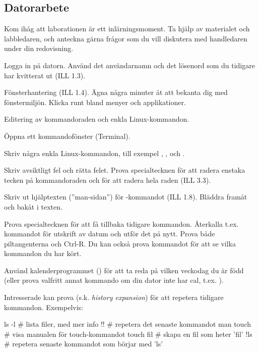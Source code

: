 \subsection{Datorarbete}
Kom ihåg att laborationen är ett inlärningsmoment. Ta hjälp av materialet och labbledaren, och anteckna gärna frågor som du vill diskutera med handledaren under din redovisning.
\begin{Datorarbete}
\item Logga in på datorn. Använd det användarnamn och det lösenord som du tidigare har kvitterat ut (ILL 1.3).
\item Fönsterhantering (ILL 1.4). Ägna några minuter åt att bekanta dig med fönstermiljön. Klicka runt bland menyer och applikationer.
\item Editering av kommandoraden och enkla Linux-kommandon.

\begin{Deluppgifter}
\item Öppna ett kommandofönster (Terminal).
\item Skriv några enkla Linux-kommandon, till exempel , ,  och .
\item Skriv avsiktligt fel och rätta felet. Prova specialtecknen för att radera enstaka tecken på kommandoraden och för att radera hela raden (ILL 3.3).
\item Skriv ut hjälptexten (''man-sidan'') för -kommandot (ILL 1.8). Bläddra framåt och bakåt i texten.
\item Prova specialtecknen för att få tillbaka tidigare kommandon. Återkalla t.ex. kommandot för utskrift av datum och utför det på nytt. Prova både piltangenterna och Ctrl-R. Du kan också prova kommandot  för att se vilka kommandon du har kört.
\item Använd kalenderprogrammet () för att ta reda på vilken veckodag du är född (eller prova valfritt annat kommando om din dator inte har cal, t.ex. ).
\item Intresserade kan prova \code{!} (s.k. \emph{history expansion}) för att repetera tidigare kommandon. Exempelvis:
\begin{Code}[language=bash,keywords=]
ls -l      # lista filer, med mer info
!!         # repetera det senaste kommandot
man touch  # visa manualen för touch-kommandot
touch fil  # skapa en fil som heter 'fil'
!ls        # repetera senaste kommandot som börjar med 'ls'
\end{Code}
\end{Deluppgifter}


\end{Datorarbete}
